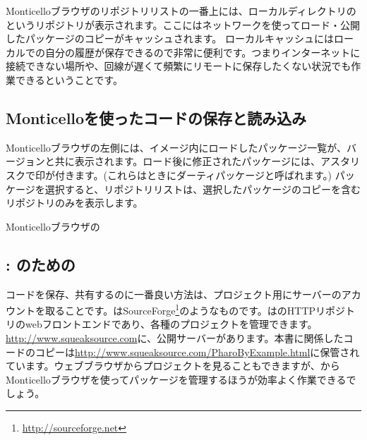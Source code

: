 \documentclass[a4paper,10pt,twoside]{book}
\begin{document}
Monticelloブラウザのリポジトリリストの一番上には、ローカルディレクトリの というリポジトリが表示されます。ここにはネットワークを使ってロード・公開したパッケージのコピーがキャッシュされます。
ローカルキャッシュにはローカルでの自分の履歴が保存できるので非常に便利です。つまりインターネットに接続できない場所や、回線が遅くて頻繁にリモートに保存したくない状況でも作業できるということです。

\subsection{Monticelloを使ったコードの保存と読み込み}
Monticelloブラウザの左側には、イメージ内にロードしたパッケージ一覧が、バージョンと共に表示されます。ロード後に修正されたパッケージには、アスタリスクで印が付きます。(これらはときにダーティパッケージと呼ばれます。) パッケージを選択すると、リポジトリリストは、選択したパッケージのコピーを含むリポジトリのみを表示します。


Monticelloブラウザの

\subsection{\ind{\sqsrc}: \pharo のための}

コードを保存、共有するのに一番良い方法は、プロジェクト用に\sqsrc サーバーのアカウントを取ることです。\sqsrc はSourceForge\footnote{\url{http://sourceforge.net}}のようなものです。\sqsrc はのHTTPリポジトリのwebフロントエンドであり、各種のプロジェクトを管理できます。
\url{http://www.squeaksource.com}に、公開\sqsrc サーバーがあります。本書に関係したコードのコピーは\url{http://www.squeaksource.com/PharoByExample.html}に保管されています。ウェブブラウザからプロジェクトを見ることもできますが、\pharo からMonticelloブラウザを使ってパッケージを管理するほうが効率よく作業できるでしょう。

\end{document}
